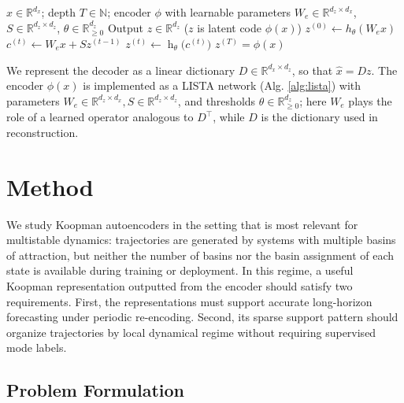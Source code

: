\begin{algorithm}[ht]
\caption{LISTA Encoder (Forward Pass)}
\label{alg:lista}
\begin{algorithmic}[1]
\REQUIRE $x \in \mathbb{R}^{d_x}$; depth $T \in \mathbb{N}$; encoder $\phi$ with learnable parameters $W_e \in \mathbb{R}^{d_z \times d_x}$, $S \in \mathbb{R}^{d_z \times d_z}$, $\theta \in \mathbb{R}^{d_z}_{\ge 0}$
\ENSURE Output $z \in \mathbb{R}^{d_z}$ ($z$ is latent code $\phi(x)$)
\STATE $z^{(0)} \gets h_\theta (W_e x)$
    \STATE $c^{(t)} \gets W_e x + Sz^{(t-1)}$ 
    \STATE $z^{(t)} \gets \operatorname{h}_{\theta} \big(c^{(t)}\big)$
\ENDFOR
\RETURN $z^{(T)} = \phi(x)$
\end{algorithmic}
\end{algorithm}

We represent the decoder as a linear dictionary $D \in \mathbb{R}^{d_x \times d_z}$, so that $\hat{x} = D z$. The encoder $\phi(x)$ is implemented as a LISTA network (Alg. \ref{alg:lista}) with parameters $W_e \in \mathbb{R}^{d_z \times d_x}, S \in \mathbb{R}^{d_z \times d_z}$, and thresholds $\theta \in \mathbb{R}^{d_z}_{\ge 0}$; here $W_e$ plays the role of a learned operator analogous to $D^\top$, while $D$ is the dictionary used in reconstruction.

\section{Method}
\label{sec:method}

We study Koopman autoencoders in the setting that is most relevant for multistable dynamics: trajectories are generated by systems with multiple basins of attraction, but neither the number of basins nor the basin assignment of each state is available during training or deployment. 
In this regime, a useful Koopman representation outputted from the encoder should satisfy two requirements. 
First, the representations must support accurate long-horizon forecasting under periodic re-encoding. 
Second, its sparse support pattern should organize trajectories by local dynamical regime without requiring supervised mode labels.

\subsection{Problem Formulation}

